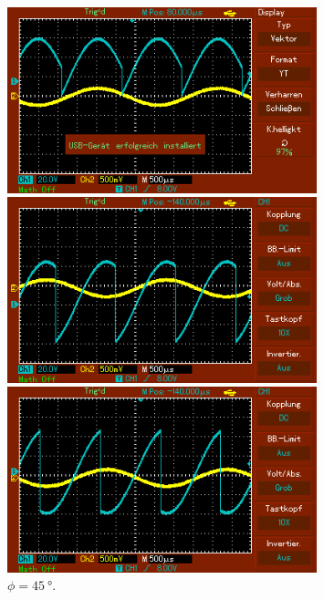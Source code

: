 \begin{figure}
    \begin{minipage}{0.5\textwidth}
        \centering
        \includegraphics[width=0.8\textwidth]{bilder/0ohne.png}
        \caption{$\phi = \SI{0}{\degree}$.} 
        \label{fig:11}
    \end{minipage}
    \hfill
    \begin{minipage}{0.5\textwidth}
        \centering
        \includegraphics[width=0.8\textwidth]{bilder/45ohne.png}
        \caption{$\phi = \SI{45}{\degree}$.} 
        \label{fig:12}
    \end{minipage}
    \vspace{1cm}
    \vfill
    \begin{minipage}{0.5\textwidth}
        \centering
        \includegraphics[width=0.8\textwidth]{bilder/90ohne.png}

\end{minipage}
\end{figure}
